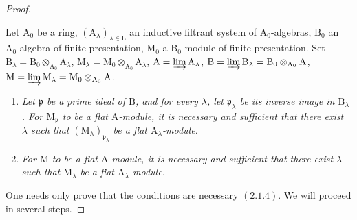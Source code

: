 \begin{proof}
\begin{corollary}[11.2.6.1]
\label{IV.11.2.6.1}
Let $\mathrm{A}_0$ be a ring, $(\mathrm{A}_\lambda)_{\lambda\in\mathrm{L}}$ an inductive filtrant system of $\mathrm{A}_0$-algebras, $\mathrm{B}_0$ an $\mathrm{A}_0$-algebra of finite presentation, $\mathrm{M}_0$ a $\mathrm{B}_0$-module of finite presentation. Set $\mathrm{B}_\lambda=\mathrm{B}_0\otimes_{\mathrm{A}_0}\mathrm{A}_\lambda$, $\mathrm{M}_\lambda=\mathrm{M}_0\otimes_{\mathrm{A}_0}\mathrm{A}_\lambda$, $\mathrm{A}=\varinjlim\mathrm{A}_\lambda$, $\mathrm{B}=\varinjlim\mathrm{B}_\lambda=\mathrm{B}_0\otimes_{\mathrm{A}_0}\mathrm{A}$, $\mathrm{M}=\varinjlim\mathrm{M}_\lambda=\mathrm{M}_0\otimes_{\mathrm{A}_0}\mathrm{A}$.
\begin{enumerate}[label=\emph{(\roman*)}]
  \item \emph{Let $\mathfrak{p}$ be a prime ideal of $\mathrm{B}$, and for every $\lambda$, let $\mathfrak{p}_\lambda$ be its inverse image in $\mathrm{B}_\lambda$. For $\mathrm{M}_\mathfrak{p}$ to be a flat $\mathrm{A}$-module, it is necessary and sufficient that there exist $\lambda$ such that $(\mathrm{M}_\lambda)_{\mathfrak{p}_\lambda}$ be a flat $\mathrm{A}_\lambda$-module.}
  \item \emph{For $\mathrm{M}$ to be a flat $\mathrm{A}$-module, it is necessary and sufficient that there exist $\lambda$ such that $\mathrm{M}_\lambda$ be a flat $\mathrm{A}_\lambda$-module.}
\end{enumerate}
\end{corollary}

One needs only prove that the conditions are necessary $(2.1.4)$. We will proceed in several steps.


\end{proof}
